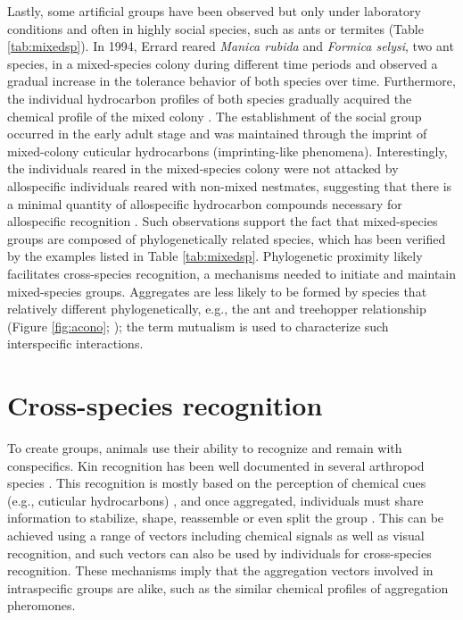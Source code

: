 Lastly, some artificial groups have been observed but only under laboratory conditions and often in highly social species, such as ants or termites (Table \ref{tab:mixedsp}). In 1994, Errard \cite{errard_development_1994} reared \textit{Manica rubida} and \textit{Formica selysi}, two ant species, in a mixed-species colony during different time periods and observed a gradual increase in the tolerance behavior of both species over time. Furthermore, the individual hydrocarbon profiles of both species gradually acquired the chemical profile of the mixed colony \cite{errard_development_1994}. The establishment of the social group occurred in the early adult stage and was maintained through the imprint of mixed-colony cuticular hydrocarbons (imprinting-like phenomena). Interestingly, the individuals reared in the mixed-species colony were not attacked by allospecific individuals reared with non-mixed nestmates, suggesting that there is a minimal quantity of allospecific hydrocarbon compounds necessary for allospecific recognition \cite{errard_development_1994}. Such observations support the fact that mixed-species groups are composed of phylogenetically related species, which has been verified by the examples listed in Table \ref{tab:mixedsp}. Phylogenetic proximity likely facilitates cross-species recognition, a mechanisms needed to initiate and maintain mixed-species groups. Aggregates are less likely to be formed by species that relatively different phylogenetically, e.g., the ant and treehopper relationship (Figure \ref{fig:acono}; \cite{wood_sociality_1979}); the term mutualism is used to characterize such interspecific interactions. 

    
	\section{Cross-species recognition}    
To create groups, animals use their ability to recognize and remain with conspecifics. Kin recognition has been well documented in several arthropod species \citep{wilson_kin_2005,costa_other_2006,jeanson_conspecific_2007,lihoreau_kin_2007,lihoreau_kin_2009,lize_kin_2010}. This recognition is mostly based on the perception of chemical cues (e.g., cuticular hydrocarbons) \citep{bell_searching_1990,chapman_insects:_1998}, and once aggregated, individuals must share information to stabilize, shape, reassemble or even split the group \cite{lachmann_advantages_2000}. This can be achieved using a range of vectors including chemical signals as well as visual recognition, and such vectors can also be used by individuals for cross-species recognition. These mechanisms imply that the aggregation vectors involved in intraspecific groups are alike, such as the similar chemical profiles of aggregation pheromones. 


